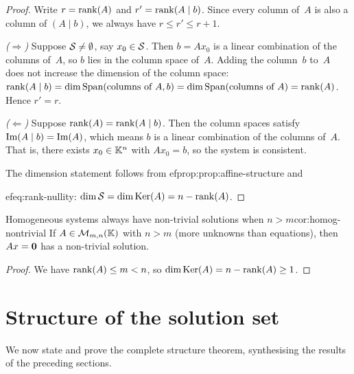 \begin{proof}
Write $r = \operatorname{rank}(A)$ and $r' = \operatorname{rank}(A\mid b)$. Since every column
of~$A$ is also a column of $(A\mid b)$, we always have $r \leq r'
\leq r+1$.

\emph{($\Rightarrow$)}
Suppose ${\mathcal{S}}\neq\emptyset$, say $x_0\in{\mathcal{S}}$. Then $b = Ax_0$ is a
linear combination of the columns of~$A$, so $b$ lies in the column
space of~$A$. Adding the column~$b$ to~$A$ does not increase the
dimension of the column space:
$\operatorname{rank}(A\mid b) = \dim\operatorname{Span}(\text{columns of } A, b) =
\dim\operatorname{Span}(\text{columns of } A) = \operatorname{rank}(A)$.
Hence $r' = r$.

\emph{($\Leftarrow$)}
Suppose $\operatorname{rank}(A) = \operatorname{rank}(A\mid b)$. Then the column spaces satisfy
$\operatorname{Im}(A\mid b) = \operatorname{Im}(A)$, which means $b$ is a linear combination of
the columns of~$A$. That is, there exists $x_0\in{\mathbb{K}}^n$ with
$Ax_0 = b$, so the system is consistent.

The dimension statement follows from 
ef{prop:prop:affine-structure} and

ef{eq:rank-nullity}: $\dim{\mathcal{S}} = \dim\operatorname{Ker}(A) = n - \operatorname{rank}(A)$.
\end{proof}

\begin{corollary}{Homogeneous systems always have non-trivial solutions
when $n > m$}{cor:homog-nontrivial}
If $A\in\mathcal{M}_{m,n}({\mathbb{K}})$ with $n > m$ (more unknowns than equations),
then $Ax = \mathbf{0}$ has a non-trivial solution.
\end{corollary}

\begin{proof}
We have $\operatorname{rank}(A) \leq m < n$, so $\dim\operatorname{Ker}(A) = n - \operatorname{rank}(A) \geq 1$.
\end{proof}


\section{Structure of the solution set}\label{sec:solution-structure}

We now state and prove the complete structure theorem, synthesising
the results of the preceding sections.

